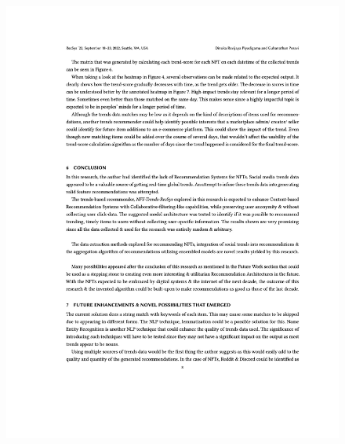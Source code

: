 \begin{figure}[h!]
\centering
\includegraphics[width=\textwidth]{images/appendix/papers/trends/Exploration of the possibility of infusing Social Media Trends into generating NFT Recommendations 8.jpeg}
\end{figure}

